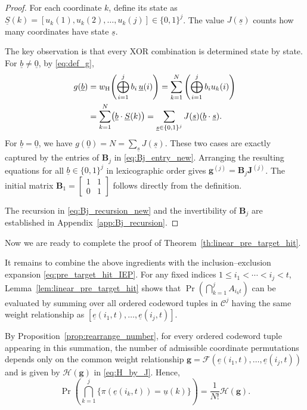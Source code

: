 \documentclass[letterpaper,draftclsnofoot,onecolumn]{IEEEtran}
\begin{document}
\begin{proof}
For each coordinate $k$, define its state as $\underline{S}(k)=[u_k(1),u_k(2),\ldots,u_k(j)] \in \{0,1\}^j$. The value $J(\underline{s})$ counts how many coordinates have state $\underline{s}$.

The key observation is that every XOR combination is determined state by state. For $\underline{b}\neq\underline{0}$, by \eqref{eq:def_g},
\begin{align}
g(\underline{b})
&=
w_{\mathrm{H}}\!\left(\bigoplus_{i=1}^{j} b_i\,\underline{u}(i)\right)
=
\sum_{k=1}^{N}\left(\bigoplus_{i=1}^{j}b_i u_k(i)\right) \notag\\
&=
\sum_{k=1}^{N}\bigl(\underline{b}\cdot\underline{S}(k)\bigr)
=
\sum_{\underline{s}\in\{0,1\}^j}J(\underline{s})(\underline{b}\cdot\underline{s}).
\label{eq:Bj_pf_state_sum}
\end{align}
For $\underline{b}=\underline{0}$, we have $g(\underline{0})=N=\sum_{\underline{s}}J(\underline{s})$. These two cases are exactly captured by the entries of $\mathbf{B}_j$ in \eqref{eq:Bj_entry_new}. Arranging the resulting equations for all $\underline{b}\in\{0,1\}^j$ in lexicographic order gives $\mathbf{g}^{(j)}=\mathbf{B}_j\mathbf{J}^{(j)}$. The initial matrix $\mathbf{B}_1=
\begin{bmatrix}
1 & 1\\
0 & 1
\end{bmatrix}$ follows directly from the definition.

The recursion in \eqref{eq:Bj_recursion_new} and the invertibility of $\mathbf{B}_j$ are established in Appendix~\ref{app:Bj_recursion}.
\end{proof}

Now we are ready to complete the proof of Theorem~\ref{th:linear_pre_target_hit}.

It remains to combine the above ingredients with the inclusion--exclusion expansion \eqref{eq:pre_target_hit_IEP}. For any fixed indices $1\le i_1<\cdots<i_j<t$, Lemma~\ref{lem:linear_pre_target_hit} shows that $\Pr\!\left(\bigcap_{k=1}^{j}A_{i_k t}\right)$ can be evaluated by summing over all ordered codeword tuples in $\mathcal{C}^j$ having the same weight relationship as $[\underline{e}(i_1,t),\ldots,\underline{e}(i_j,t)]$.

By Proposition~\ref{prop:rearrange_number}, for every ordered codeword tuple appearing in this summation, the number of admissible coordinate permutations depends only on the common weight relationship $\mathbf{g}=\mathcal{F}(\underline{e}(i_1,t),\ldots,\underline{e}(i_j,t))$ and is given by $\mathcal{H}(\mathbf{g})$ in \eqref{eq:H_by_J}. Hence,
\begin{equation}
\Pr\!\left(
\bigcap_{k=1}^{j}\{\pi(\underline{e}(i_k,t))=\underline{u}(k)\}
\right)
=
\frac{1}{N!}\mathcal{H}(\mathbf{g}).
\end{equation}
\end{document}
